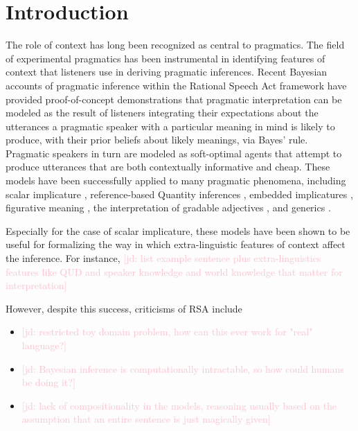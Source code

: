 \documentclass[11pt,a4paper]{article}
\newcommand{\jd}[1]{\textcolor{Pink}{[jd: #1]}}
\begin{document}
\section{Introduction}

The role of context has long been recognized as central to pragmatics. The field of experimental pragmatics has been instrumental in identifying features of context that listeners use in deriving pragmatic inferences. Recent Bayesian accounts of pragmatic inference within the Rational Speech Act framework \cite{frank2012predicting, goodman2016pragmatic, franke2016probabilistic} have provided proof-of-concept demonstrations that pragmatic interpretation can be modeled as the result of listeners integrating their expectations about the utterances a pragmatic speaker with a particular meaning in mind is likely to produce, with their prior beliefs about likely meanings, via Bayes' rule. Pragmatic speakers in turn are modeled as soft-optimal agents that attempt to produce utterances that are both contextually informative and cheap. These models have been successfully applied to many pragmatic phenomena, including scalar implicature \cite{goodman2013knowledge, degen2015processing}, reference-based Quantity inferences \cite{frank2012predicting, qing2015variations, stiller2015ad, franke2016reasoning}, embedded implicatures \cite{bergen2016pragmatic}, figurative meaning \cite{kao2014nonliteral}, the interpretation of gradable adjectives \cite{lassiter2013context}, and generics \cite{tessler2019language}.

Especially for the case of scalar implicature, these models have been shown to be useful for formalizing the way in which extra-linguistic features of context affect the inference. For instance,  \jd{list example sentence plus extra-linguistics features like QUD and speaker knowledge and world knowledge that matter for interpretation}

However, despite this success, criticisms of RSA include
\begin{itemize}
	\item \jd{restricted toy domain problem, how can this ever work for "real" language?}
	\item \jd{Bayesian inference is computationally intractable, so how could humans  be doing it?}
	\item \jd{lack of compositionality in the models, reasoning usually based on the assumption that an entire sentence is just magically given}
\end{itemize}
\end{document}
